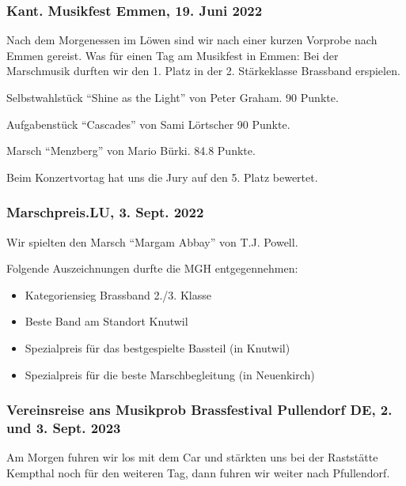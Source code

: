 \begin{history}

    \subsubsection*{Kant. Musikfest Emmen, 19. Juni 2022}

    Nach dem Morgenessen im Löwen sind wir nach einer kurzen Vorprobe nach Emmen
    gereist. Was für einen Tag am Musikfest in Emmen: Bei der Marschmusik
    durften wir den 1. Platz in der 2. Stärkeklasse Brassband erspielen.

    Selbstwahlstück   \enquote{Shine as the Light} von Peter Graham. 90 Punkte.

    Aufgabenstück \enquote{Cascades} von Sami Lörtscher 90 Punkte.

    Marsch \enquote{Menzberg} von Mario Bürki. 84.8 Punkte.


    Beim Konzertvortag hat uns die Jury auf den 5. Platz bewertet.


    \subsubsection*{Marschpreis.LU, 3. Sept. 2022}

    Wir spielten den Marsch \enquote{Margam Abbay} von T.J. Powell.

    Folgende Auszeichnungen durfte die MGH entgegennehmen:
    \begin{itemize}
        \item Kategoriensieg Brassband 2./3. Klasse\\
        \item Beste Band am Standort Knutwil\\
        \item Spezialpreis für das bestgespielte Bassteil (in Knutwil)\\
        \item Spezialpreis für die beste Marschbegleitung (in Neuenkirch)\\
    \end{itemize}


    \subsubsection*{Vereinsreise ans Musikprob Brassfestival Pullendorf DE, 2. und 3. Sept. 2023}

    Am Morgen fuhren wir los mit dem Car und stärkten uns bei der
    Raststätte Kempthal noch für den weiteren Tag, dann fuhren wir
    weiter nach Pfullendorf.


\end{history}
